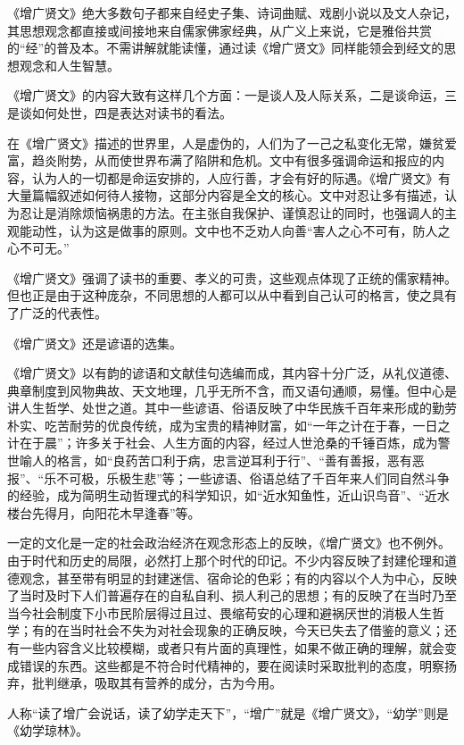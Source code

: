 \documentclass[12pt,UTF8]{ctexbook}
\begin{document}
《增广贤文》绝大多数句子都来自经史子集、诗词曲赋、戏剧小说以及文人杂记，其思想观念都直接或间接地来自儒家佛家经典，从广义上来说，它是雅俗共赏的“经”的普及本。不需讲解就能读懂，通过读《增广贤文》同样能领会到经文的思想观念和人生智慧。

《增广贤文》的内容大致有这样几个方面：一是谈人及人际关系，二是谈命运，三是谈如何处世，四是表达对读书的看法。

在《增广贤文》描述的世界里，人是虚伪的，人们为了一己之私变化无常，嫌贫爱富，趋炎附势，从而使世界布满了陷阱和危机。文中有很多强调命运和报应的内容，认为人的一切都是命运安排的，人应行善，才会有好的际遇。《增广贤文》有大量篇幅叙述如何待人接物，这部分内容是全文的核心。文中对忍让多有描述，认为忍让是消除烦恼祸患的方法。在主张自我保护、谨慎忍让的同时，也强调人的主观能动性，认为这是做事的原则。文中也不乏劝人向善“害人之心不可有，防人之心不可无。”

《增广贤文》强调了读书的重要、孝义的可贵，这些观点体现了正统的儒家精神。但也正是由于这种庞杂，不同思想的人都可以从中看到自己认可的格言，使之具有了广泛的代表性。

《增广贤文》还是谚语的选集。

《增广贤文》以有韵的谚语和文献佳句选编而成，其内容十分广泛，从礼仪道德、典章制度到风物典故、天文地理，几乎无所不含，而又语句通顺，易懂。但中心是讲人生哲学、处世之道。其中一些谚语、俗语反映了中华民族千百年来形成的勤劳朴实、吃苦耐劳的优良传统，成为宝贵的精神财富，如“一年之计在于春，一日之计在于晨”；许多关于社会、人生方面的内容，经过人世沧桑的千锤百炼，成为警世喻人的格言，如“良药苦口利于病，忠言逆耳利于行”、“善有善报，恶有恶报”、“乐不可极，乐极生悲”等；一些谚语、俗语总结了千百年来人们同自然斗争的经验，成为简明生动哲理式的科学知识，如“近水知鱼性，近山识鸟音”、“近水楼台先得月，向阳花木早逢春”等。

一定的文化是一定的社会政治经济在观念形态上的反映，《增广贤文》也不例外。由于时代和历史的局限，必然打上那个时代的印记。不少内容反映了封建伦理和道德观念，甚至带有明显的封建迷信、宿命论的色彩；有的内容以个人为中心，反映了当时及时下人们普遍存在的自私自利、损人利己的思想；有的反映了在当时乃至当今社会制度下小市民阶层得过且过、畏缩苟安的心理和避祸厌世的消极人生哲学；有的在当时社会不失为对社会现象的正确反映，今天已失去了借鉴的意义；还有一些内容含义比较模糊，或者只有片面的真理性，如果不做正确的理解，就会变成错误的东西。这些都是不符合时代精神的，要在阅读时采取批判的态度，明察扬弃，批判继承，吸取其有营养的成分，古为今用。

人称“读了增广会说话，读了幼学走天下”，“增广”就是《增广贤文》，“幼学”则是《幼学琼林》。
\end{document}
